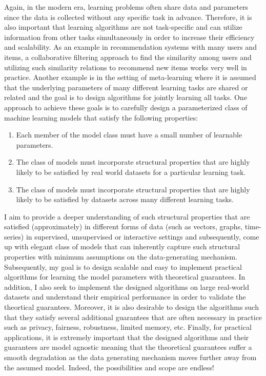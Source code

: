 \documentclass[paper=a4, fontsize=12pt]{article}
\begin{document}
Again, in the modern era, learning problems often share data and parameters since the data is collected without any specific task in advance. Therefore, it is also important that learning algorithms are not task-specific and can utilize information from other tasks simultaneously in order to increase their efficiency and scalability. As an example in recommendation systems with many users and items, a collaborative filtering approach to find the similarity among users and utilizing such similarity relations to recommend new items works very well in practice. Another example is in the setting of meta-learning where it is assumed that the underlying parameters of many different learning tasks are shared or related and the goal is to design algorithms for jointly learning all tasks. One approach to achieve these goals is to carefully design a parameterized class of machine learning models that satisfy the following properties:
\begin{enumerate}
    \item Each member of the model class must have a small number of learnable parameters.
    \item The class of models must incorporate structural properties that are highly likely to be satisfied by real world datasets for a particular learning task. 
    \item The class of models must incorporate structural properties that are highly likely to be satisfied by datasets across many different learning tasks.
\end{enumerate}

I aim to provide a deeper understanding of such structural properties that are satisfied (approximately) in different forms of data (such as vectors, graphs, time-series) in supervised, unsupervised or interactive settings and subsequently, come up with elegant class of models that can inherently capture such structural properties with minimum assumptions on the data-generating mechanism. Subsequently, my goal is to design scalable and easy to implement practical algorithms for learning the model parameters with theoretical guarantees. In addition, I also seek to implement the designed algorithms on large real-world datasets and understand their empirical performance in order to validate the theortical guarantees. Moreover, it is also desirable to design the algorithms such that they satisfy several additional guarantees that are often necessary in practice such as privacy, fairness, robustness, limited memory, etc. Finally, for practical applications, it is extremely important that the designed algorithms and their guarantees are model agnostic meaning that the theoretical guarantees suffer a smooth degradation as the data generating mechanism moves further away from the assumed model. Indeed, the possibilities and scope are endless!
\end{document}
